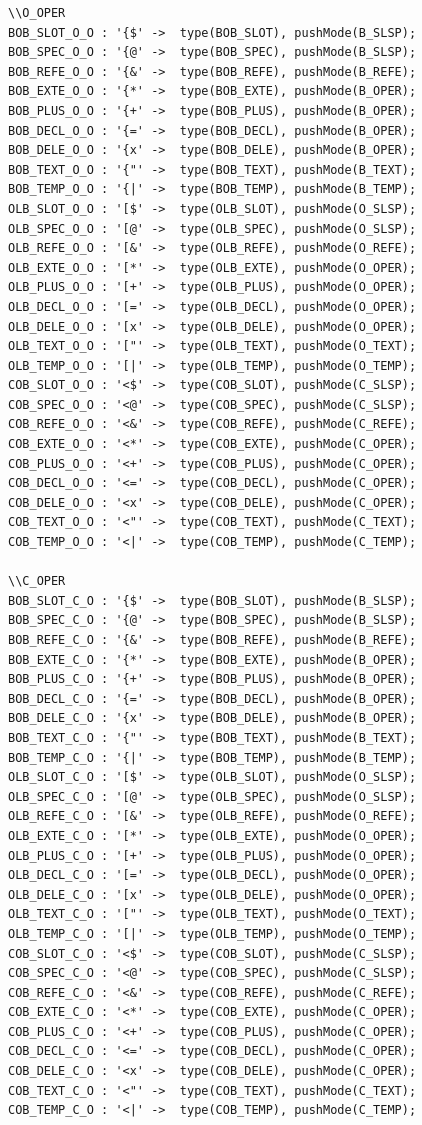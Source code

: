 \begin{verbatim}
\\O_OPER
BOB_SLOT_O_O : '{$' ->  type(BOB_SLOT), pushMode(B_SLSP);
BOB_SPEC_O_O : '{@' ->  type(BOB_SPEC), pushMode(B_SLSP);
BOB_REFE_O_O : '{&' ->  type(BOB_REFE), pushMode(B_REFE);
BOB_EXTE_O_O : '{*' ->  type(BOB_EXTE), pushMode(B_OPER);
BOB_PLUS_O_O : '{+' ->  type(BOB_PLUS), pushMode(B_OPER);
BOB_DECL_O_O : '{=' ->  type(BOB_DECL), pushMode(B_OPER);
BOB_DELE_O_O : '{x' ->  type(BOB_DELE), pushMode(B_OPER);
BOB_TEXT_O_O : '{"' ->  type(BOB_TEXT), pushMode(B_TEXT);
BOB_TEMP_O_O : '{|' ->  type(BOB_TEMP), pushMode(B_TEMP);
OLB_SLOT_O_O : '[$' ->  type(OLB_SLOT), pushMode(O_SLSP);
OLB_SPEC_O_O : '[@' ->  type(OLB_SPEC), pushMode(O_SLSP);
OLB_REFE_O_O : '[&' ->  type(OLB_REFE), pushMode(O_REFE);
OLB_EXTE_O_O : '[*' ->  type(OLB_EXTE), pushMode(O_OPER);
OLB_PLUS_O_O : '[+' ->  type(OLB_PLUS), pushMode(O_OPER);
OLB_DECL_O_O : '[=' ->  type(OLB_DECL), pushMode(O_OPER);
OLB_DELE_O_O : '[x' ->  type(OLB_DELE), pushMode(O_OPER);
OLB_TEXT_O_O : '["' ->  type(OLB_TEXT), pushMode(O_TEXT);
OLB_TEMP_O_O : '[|' ->  type(OLB_TEMP), pushMode(O_TEMP);
COB_SLOT_O_O : '<$' ->  type(COB_SLOT), pushMode(C_SLSP);
COB_SPEC_O_O : '<@' ->  type(COB_SPEC), pushMode(C_SLSP);
COB_REFE_O_O : '<&' ->  type(COB_REFE), pushMode(C_REFE);
COB_EXTE_O_O : '<*' ->  type(COB_EXTE), pushMode(C_OPER);
COB_PLUS_O_O : '<+' ->  type(COB_PLUS), pushMode(C_OPER);
COB_DECL_O_O : '<=' ->  type(COB_DECL), pushMode(C_OPER);
COB_DELE_O_O : '<x' ->  type(COB_DELE), pushMode(C_OPER);
COB_TEXT_O_O : '<"' ->  type(COB_TEXT), pushMode(C_TEXT);
COB_TEMP_O_O : '<|' ->  type(COB_TEMP), pushMode(C_TEMP);

\\C_OPER
BOB_SLOT_C_O : '{$' ->  type(BOB_SLOT), pushMode(B_SLSP);
BOB_SPEC_C_O : '{@' ->  type(BOB_SPEC), pushMode(B_SLSP);
BOB_REFE_C_O : '{&' ->  type(BOB_REFE), pushMode(B_REFE);
BOB_EXTE_C_O : '{*' ->  type(BOB_EXTE), pushMode(B_OPER);
BOB_PLUS_C_O : '{+' ->  type(BOB_PLUS), pushMode(B_OPER);
BOB_DECL_C_O : '{=' ->  type(BOB_DECL), pushMode(B_OPER);
BOB_DELE_C_O : '{x' ->  type(BOB_DELE), pushMode(B_OPER);
BOB_TEXT_C_O : '{"' ->  type(BOB_TEXT), pushMode(B_TEXT);
BOB_TEMP_C_O : '{|' ->  type(BOB_TEMP), pushMode(B_TEMP);
OLB_SLOT_C_O : '[$' ->  type(OLB_SLOT), pushMode(O_SLSP);
OLB_SPEC_C_O : '[@' ->  type(OLB_SPEC), pushMode(O_SLSP);
OLB_REFE_C_O : '[&' ->  type(OLB_REFE), pushMode(O_REFE);
OLB_EXTE_C_O : '[*' ->  type(OLB_EXTE), pushMode(O_OPER);
OLB_PLUS_C_O : '[+' ->  type(OLB_PLUS), pushMode(O_OPER);
OLB_DECL_C_O : '[=' ->  type(OLB_DECL), pushMode(O_OPER);
OLB_DELE_C_O : '[x' ->  type(OLB_DELE), pushMode(O_OPER);
OLB_TEXT_C_O : '["' ->  type(OLB_TEXT), pushMode(O_TEXT);
OLB_TEMP_C_O : '[|' ->  type(OLB_TEMP), pushMode(O_TEMP);
COB_SLOT_C_O : '<$' ->  type(COB_SLOT), pushMode(C_SLSP);
COB_SPEC_C_O : '<@' ->  type(COB_SPEC), pushMode(C_SLSP);
COB_REFE_C_O : '<&' ->  type(COB_REFE), pushMode(C_REFE);
COB_EXTE_C_O : '<*' ->  type(COB_EXTE), pushMode(C_OPER);
COB_PLUS_C_O : '<+' ->  type(COB_PLUS), pushMode(C_OPER);
COB_DECL_C_O : '<=' ->  type(COB_DECL), pushMode(C_OPER);
COB_DELE_C_O : '<x' ->  type(COB_DELE), pushMode(C_OPER);
COB_TEXT_C_O : '<"' ->  type(COB_TEXT), pushMode(C_TEXT);
COB_TEMP_C_O : '<|' ->  type(COB_TEMP), pushMode(C_TEMP);



\end{verbatim}
